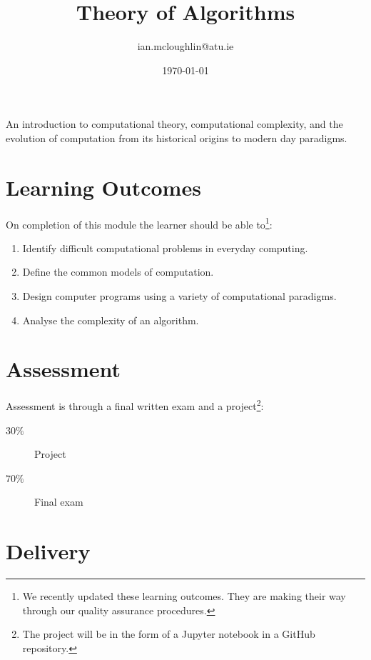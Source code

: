 \documentclass{iansnotes}
\title{Theory of Algorithms}
\author{ian.mcloughlin@atu.ie}
\date{\today}
\begin{document}
\maketitle

An introduction to computational theory, computational complexity, and the evolution of computation from its historical origins to modern day paradigms.

\section{Learning Outcomes}

On completion of this module the learner should be able to\footnote{We recently updated these learning outcomes. They are making their way through our quality assurance procedures.}:

\begin{enumerate}
  \item Identify difficult computational problems in everyday computing.
  \item Define the common models of computation.
  \item Design computer programs using a variety of computational paradigms.
  \item Analyse the complexity of an algorithm.
\end{enumerate}


\section{Assessment}

Assessment is through a final written exam and a project\footnote{The project will be in the form of a Jupyter notebook in a GitHub repository.}:

\begin{description}
  \item[$30\%$] Project
  \item[$70\%$] Final exam
\end{description}

 
\section{Delivery}
\end{document}
